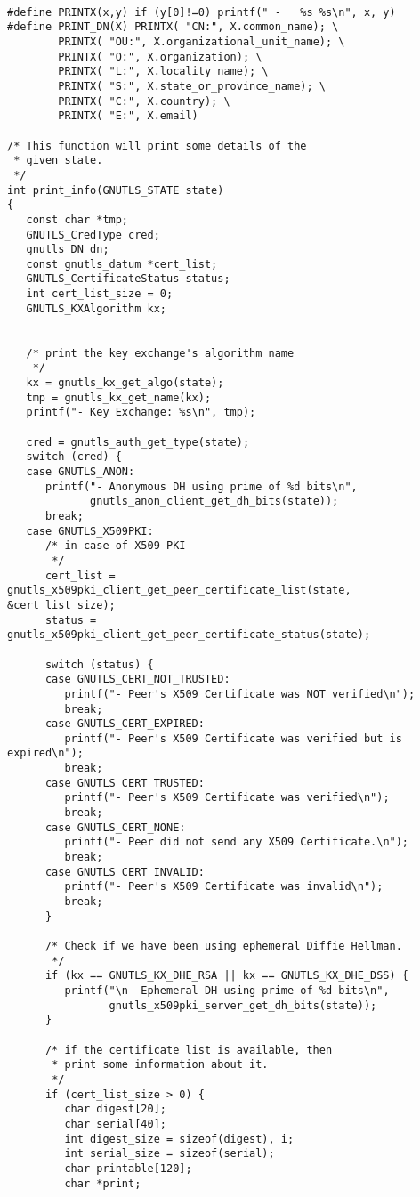 \begin{verbatim}

#define PRINTX(x,y) if (y[0]!=0) printf(" -   %s %s\n", x, y)
#define PRINT_DN(X) PRINTX( "CN:", X.common_name); \
        PRINTX( "OU:", X.organizational_unit_name); \
        PRINTX( "O:", X.organization); \
        PRINTX( "L:", X.locality_name); \
        PRINTX( "S:", X.state_or_province_name); \
        PRINTX( "C:", X.country); \
        PRINTX( "E:", X.email)

/* This function will print some details of the
 * given state.
 */
int print_info(GNUTLS_STATE state)
{
   const char *tmp;
   GNUTLS_CredType cred;
   gnutls_DN dn;
   const gnutls_datum *cert_list;
   GNUTLS_CertificateStatus status;
   int cert_list_size = 0;
   GNUTLS_KXAlgorithm kx;


   /* print the key exchange's algorithm name
    */
   kx = gnutls_kx_get_algo(state);
   tmp = gnutls_kx_get_name(kx);
   printf("- Key Exchange: %s\n", tmp);

   cred = gnutls_auth_get_type(state);
   switch (cred) {
   case GNUTLS_ANON:
      printf("- Anonymous DH using prime of %d bits\n",
             gnutls_anon_client_get_dh_bits(state));
      break;
   case GNUTLS_X509PKI:
      /* in case of X509 PKI
       */
      cert_list = gnutls_x509pki_client_get_peer_certificate_list(state, &cert_list_size);
      status = gnutls_x509pki_client_get_peer_certificate_status(state);

      switch (status) {
      case GNUTLS_CERT_NOT_TRUSTED:
         printf("- Peer's X509 Certificate was NOT verified\n");
         break;
      case GNUTLS_CERT_EXPIRED:
         printf("- Peer's X509 Certificate was verified but is expired\n");
         break;
      case GNUTLS_CERT_TRUSTED:
         printf("- Peer's X509 Certificate was verified\n");
         break;
      case GNUTLS_CERT_NONE:
         printf("- Peer did not send any X509 Certificate.\n");
         break;
      case GNUTLS_CERT_INVALID:
         printf("- Peer's X509 Certificate was invalid\n");
         break;
      }

      /* Check if we have been using ephemeral Diffie Hellman.
       */
      if (kx == GNUTLS_KX_DHE_RSA || kx == GNUTLS_KX_DHE_DSS) {
         printf("\n- Ephemeral DH using prime of %d bits\n",
                gnutls_x509pki_server_get_dh_bits(state));
      }

      /* if the certificate list is available, then
       * print some information about it.
       */
      if (cert_list_size > 0) {
         char digest[20];
         char serial[40];
         int digest_size = sizeof(digest), i;
         int serial_size = sizeof(serial);
         char printable[120];
         char *print;


\end{verbatim}
